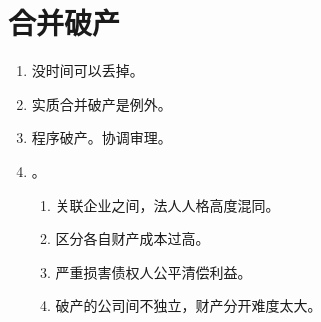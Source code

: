 \section{合并破产}
\begin{enumerate}
  \item 没时间可以丢掉。
  \item 实质合并破产是例外。
  \item 程序破产。协调审理。
  \item {}。
        \begin{enumerate}
          \item 关联企业之间，法人人格高度混同。
          \item 区分各自财产成本过高。
          \item 严重损害债权人公平清偿利益。
          \item 破产的公司间不独立，财产分开难度太大。
        \end{enumerate}
\end{enumerate}
